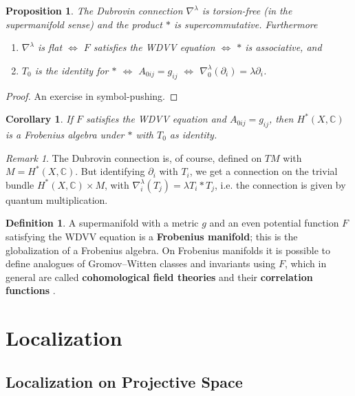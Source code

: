 \documentclass{report}
\theoremstyle{plain}
\newtheorem{proposition}[theorem]{Proposition}
\newtheorem{corollary}[theorem]{Corollary}
\theoremstyle{definition}
\newtheorem{definition}[theorem]{Definition}
\theoremstyle{remark}
\newtheorem*{remark}{Remark}
\newcommand{\di}{\partial}
\newcommand{\bC}{\mathbb{C}}
\begin{document}
\begin{proposition} \label{thm:dubrovin-connection-is-flat}
  The Dubrovin connection $\nabla^\lambda$ is torsion-free (in the
  supermanifold sense) and the product $*$ is supercommutative.
  Furthermore
  \begin{enumerate}
  \item $\nabla^\lambda$ is flat $\iff$ $F$ satisfies the WDVV
    equation $\iff$ $*$ is associative, and
  \item $T_0$ is the identity for $*$ $\iff$ $A_{0ij} = g_{ij}$ $\iff$
    $\nabla_0^\lambda(\di_i) = \lambda \di_i$.
  \end{enumerate}
\end{proposition}

\begin{proof}
  An exercise in symbol-pushing.
\end{proof}

\begin{corollary}
  If $F$ satisfies the WDVV equation and $A_{0ij} = g_{ij}$, then
  $H^*(X, \bC)$ is a Frobenius algebra under $*$ with $T_0$ as
  identity.
\end{corollary}

\begin{remark}
  The Dubrovin connection is, of course, defined on $TM$ with $M =
  H^*(X, \bC)$. But identifying $\di_i$ with $T_i$, we get a
  connection on the trivial bundle $H^*(X, \bC) \times M$, with
  $\nabla_i^\lambda(T_j) = \lambda T_i * T_j$, i.e. the connection is
  given by quantum multiplication.
\end{remark}

\begin{definition}
  A supermanifold with a metric $g$ and an even potential function $F$
  satisfying the WDVV equation is a {\bf Frobenius manifold}; this is
  the globalization of a Frobenius algebra. On Frobenius manifolds it
  is possible to define analogues of Gromov--Witten classes and
  invariants using $F$, which in general are called {\bf cohomological
    field theories} and their {\bf correlation functions}
  \cite{Manin1999}.
\end{definition}

\section{Localization}

\subsection{Localization on Projective Space}
\end{document}
